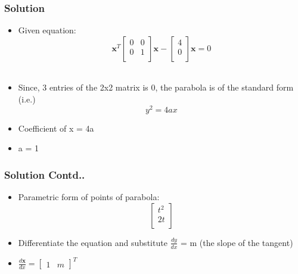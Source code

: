 \documentclass[12pt]{beamer}
\begin{document}
\begin{frame}
\frametitle{Solution}
\begin{itemize}
\item<1-4> Given equation:
\[
\textbf{x}^T
\begin{bmatrix}
    0 & 0\\
    0 & 1\\  
\end{bmatrix}
\textbf{x}  -  
\begin{bmatrix}
    4\\
    0\\  
\end{bmatrix}
\textbf{x} = 0
\] \\
\item<2-4> Since, 3 entries of the 2x2 matrix is 0, the parabola is of the standard form (i.e.) \[ y^2 = 4ax\]
\item<3-4> Coefficient of x = 4a
\item<4> a = 1
\end{itemize}
\end{frame}


\begin{frame}
\frametitle{Solution Contd..}
\begin{itemize}
\item<1-3> Parametric form of points of parabola: 
\[
\begin{bmatrix}
    t^2\\
    2t\\  
\end{bmatrix}
\]
\item<2-3> Differentiate the equation and substitute $\frac{dy}{dx}$ = m (the slope of the tangent)
\item<3> $\frac{d\textbf{x}}{dx} = 
\begin{bmatrix}
    1 & m
\end{bmatrix}^T$
\end{itemize}
\end{frame}

\end{document}
